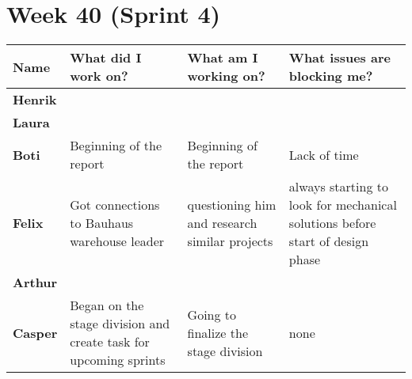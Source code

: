 \documentclass[landscape]{article}
\begin{document}
    \section{Week 40 (Sprint 4)}
    \begin{table}[H]
        \begin{center}
            \begin{tabularx}{\linewidth}{L|L|L|L}
                
                \textbf{Name} & \textbf{What did I work on?} & \textbf{What am I working on? }& \textbf{What issues are blocking me?} \\
                \hline
                \textbf{Henrik} &  &  &  \\
                \hline
                \textbf{Laura} & & & \\
                \hline
                \textbf{Boti} & Beginning of the report & Beginning of the report & Lack of time \\
                \hline
                \textbf{Felix} & Got connections to Bauhaus warehouse leader & 
                questioning him and research similar projects & always starting 
                to look for mechanical solutions before start of design phase \\
                \hline
                \textbf{Arthur} & & & \\
                \hline
                \textbf{Casper} & Began on the stage division and create task
                for upcoming sprints & Going to
                finalize the stage division & none
            \end{tabularx}
        \end{center}
    \end{table}
\end{document}
